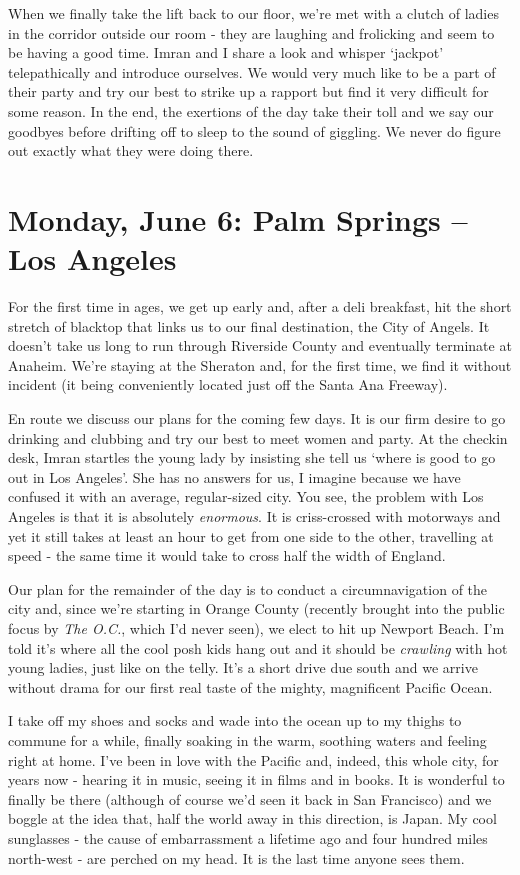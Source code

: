 \documentclass[a5paper,titlepage,11pt]{book}
\begin{document}
When we finally take the lift back to our floor, we're met with a clutch of ladies in the corridor outside our room - they are laughing and frolicking and seem to be having a good time.  Imran and I share a look and whisper `jackpot' telepathically and introduce ourselves.  We would very much like to be a part of their party and try our best to strike up a rapport but find it very difficult for some reason.  In the end, the exertions of the day take their toll and we say our goodbyes before drifting off to sleep to the sound of giggling.  We never do figure out exactly what they were doing there.

\chapter[Palm Springs -- Los Angeles]{Monday, June 6:  Palm Springs -- Los Angeles}
For the first time in ages, we get up early and, after a deli breakfast, hit the short stretch of blacktop that links us to our final destination, the City of Angels.  It doesn't take us long to run through Riverside County and eventually terminate at Anaheim.  We're staying at the Sheraton and, for the first time, we find it without incident (it being conveniently located just off the Santa Ana Freeway).

En route we discuss our plans for the coming few days.  It is our firm desire to go drinking and clubbing and try our best to meet women and party.  At the checkin desk, Imran startles the young lady by insisting she tell us `where is good to go out in Los Angeles'.  She has no answers for us, I imagine because we have confused it with an average, regular-sized city.  You see, the problem with Los Angeles is that it is absolutely \emph{enormous}.  It is criss-crossed with motorways and yet it still takes at least an hour to get from one side to the other, travelling at speed - the same time it would take to cross half the width of England.

Our plan for the remainder of the day is to conduct a circumnavigation of the city and, since we're starting in Orange County (recently brought into the public focus by \emph{The O.C.}, which I'd never seen), we elect to hit up Newport Beach.  I'm told it's where all the cool posh kids hang out and it should be \emph{crawling} with hot young ladies, just like on the telly.  It's a short drive due south and we arrive without drama for our first real taste of the mighty, magnificent Pacific Ocean.

I take off my shoes and socks and wade into the ocean up to my thighs to commune for a while, finally soaking in the warm, soothing waters and feeling right at home.  I've been in love with the Pacific and, indeed, this whole city, for years now - hearing it in music, seeing it in films and in books.  It is wonderful to finally be there (although of course we'd seen it back in San Francisco) and we boggle at the idea that, half the world away in this direction, is Japan.  My cool sunglasses - the cause of embarrassment a lifetime ago and four hundred miles north-west - are perched on my head.  It is the last time anyone sees them.
\end{document}
